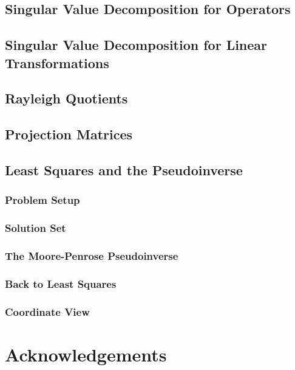 \documentclass[10pt]{article}
\begin{document}
\subsection{Singular Value Decomposition for Operators}
\subsection{Singular Value Decomposition for Linear Transformations}
\subsection{Rayleigh Quotients}
\subsection{Projection Matrices}
\subsection{Least Squares and the Pseudoinverse}
\subsubsection{Problem Setup}
\subsubsection{Solution Set} 
\subsubsection{The Moore-Penrose Pseudoinverse}
\subsubsection{Back to Least Squares}
\subsubsection{Coordinate View}

\section{Acknowledgements}
\end{document}
